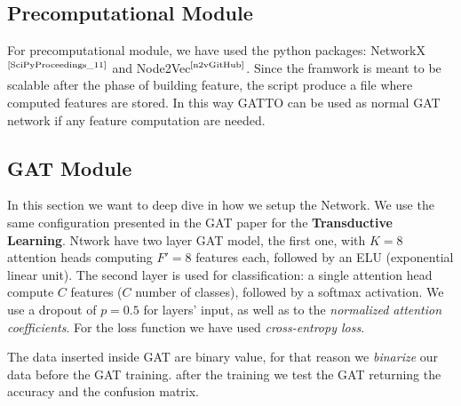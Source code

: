 \documentclass[12pt,conference]{ieeeconf} %
\begin{document}
\subsection{Precomputational Module}
For precomputational module, we have used the python packages: NetworkX$^{\text{\cite{SciPyProceedings_11}}}$ and Node2Vec$^{\text{\cite{n2vGitHub}}}$.
Since the framwork is meant to be scalable after the phase of building feature, the script produce a file where computed features are stored.
In this way GATTO can be used as normal GAT network if any feature computation are needed.

\subsection{GAT Module}
In this section we want to deep dive in how we setup the Network.
We use the same configuration presented in the GAT paper for the \textbf{Transductive Learning}.
Ntwork have two layer GAT model, the first one, with $K = 8$ attention heads computing $F'=8$ features each, followed by an ELU (exponential linear unit).
The second layer is used for classification: a single attention head compute $C$ features ($C$ number of classes), followed by a softmax activation. 
We use a dropout of $p = 0.5$ for layers' input, as well as to the \textit{normalized attention coefficients}.
For the loss function we have used \textit{cross-entropy loss}.

The data inserted inside GAT are binary value, for that reason we \textit{binarize} our data before the GAT training.
after the training we test the GAT returning the accuracy and the confusion matrix.

\end{document}
